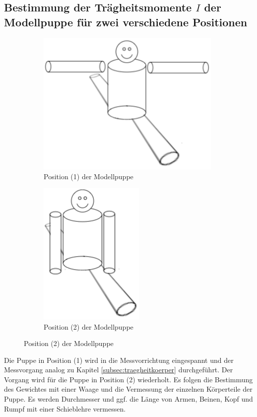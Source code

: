 \subsection{Bestimmung der Trägheitsmomente $I$ der Modellpuppe für zwei verschiedene Positionen}
\begin{figure}[h]
	\centering
	\label{fig:puppe}
	\begin{subfigure}
		\label{fig:puppe1}
		\includegraphics[height=7cm]{puppe1}
		\caption{Position (1) der Modellpuppe}
	\end{subfigure}
	\begin{subfigure}
		\label{fig:puppe2}
		\includegraphics[height=7cm]{puppe2}
		\caption{Position (2) der Modellpuppe}
	\end{subfigure}
\end{figure}
Die Puppe in Position (1) wird in die Messvorrichtung eingespannt und 
der Messvorgang analog zu Kapitel \ref{subsec:traegheitkoerper} durchgeführt. 
Der Vorgang wird für die Puppe in Position (2) wiederholt.
Es folgen die Bestimmung des Gewichtes mit einer Waage und die Vermessung der einzelnen Körperteile der Puppe. 
Es werden Durchmesser und ggf. die Länge von Armen, Beinen, Kopf und Rumpf mit einer Schieblehre vermessen.

